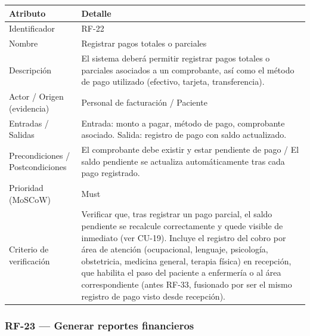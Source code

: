 \documentclass[11pt,a4paper]{article}
\begin{document}
	\begin{longtable}{p{} p{}}
		
		\toprule
		\textbf{Atributo} & \textbf{Detalle} \\
		\midrule
		\endhead
		
		Identificador & RF-22 \\
		Nombre & Registrar pagos totales o parciales \\
		Descripción & El sistema deberá permitir registrar pagos totales o parciales asociados a un comprobante, así como el método de pago utilizado (efectivo, tarjeta, transferencia). \\
		Actor / Origen (evidencia) & Personal de facturación / Paciente \\
		Entradas / Salidas & Entrada: monto a pagar, método de pago, comprobante asociado. Salida: registro de pago con saldo actualizado. \\
		Precondiciones / Postcondiciones & El comprobante debe existir y estar pendiente de pago / El saldo pendiente se actualiza automáticamente tras cada pago registrado. \\
		Prioridad (MoSCoW) & Must \\
		Criterio de verificación & Verificar que, tras registrar un pago parcial, el saldo pendiente se recalcule correctamente y quede visible de inmediato (ver CU-19). Incluye el registro del cobro por área de atención (ocupacional, lenguaje, psicología, obstetricia, medicina general, terapia física) en recepción, que habilita el paso del paciente a enfermería o al área correspondiente (antes RF-33, fusionado por ser el mismo registro de pago visto desde recepción). \\
		\bottomrule
	\end{longtable}
	
	\subsubsection{RF-23 --- Generar reportes financieros}
	
\end{document}
